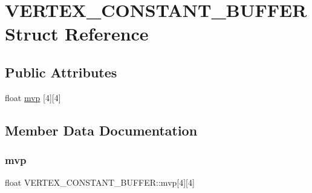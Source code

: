 \hypertarget{struct_v_e_r_t_e_x___c_o_n_s_t_a_n_t___b_u_f_f_e_r}{}\section{V\+E\+R\+T\+E\+X\+\_\+\+C\+O\+N\+S\+T\+A\+N\+T\+\_\+\+B\+U\+F\+F\+ER Struct Reference}
\label{struct_v_e_r_t_e_x___c_o_n_s_t_a_n_t___b_u_f_f_e_r}
\subsection*{Public Attributes}
\begin{DoxyCompactItemize}
\item 
float \hyperlink{struct_v_e_r_t_e_x___c_o_n_s_t_a_n_t___b_u_f_f_e_r_aa6dadd05bc56d25beeb1b26985feffea}{mvp} \mbox{[}4\mbox{]}\mbox{[}4\mbox{]}
\end{DoxyCompactItemize}


\subsection{Member Data Documentation}
\hypertarget{struct_v_e_r_t_e_x___c_o_n_s_t_a_n_t___b_u_f_f_e_r_aa6dadd05bc56d25beeb1b26985feffea}{}\label{struct_v_e_r_t_e_x___c_o_n_s_t_a_n_t___b_u_f_f_e_r_aa6dadd05bc56d25beeb1b26985feffea} 
\subsubsection{\texorpdfstring{mvp}{mvp}}
{\footnotesize\ttfamily float V\+E\+R\+T\+E\+X\+\_\+\+C\+O\+N\+S\+T\+A\+N\+T\+\_\+\+B\+U\+F\+F\+E\+R\+::mvp\mbox{[}4\mbox{]}\mbox{[}4\mbox{]}}

